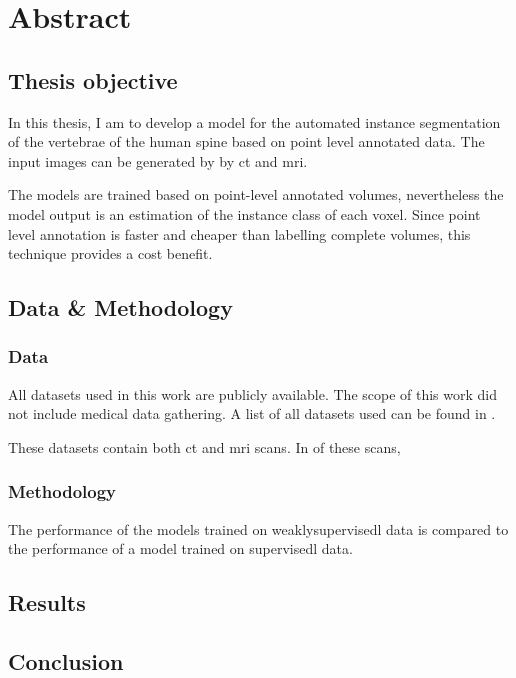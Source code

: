 \chapter{Abstract}

\section{Thesis objective}
In this thesis, I am to develop a model for the automated instance segmentation of the vertebrae of the human spine based on point level annotated data.
The input images can be generated by by \acrfull{ct} and \acrfull{mri}.


The models are trained based on point-level annotated volumes, nevertheless the model output is an estimation of the instance class of each voxel.
Since point level annotation is faster and cheaper than labelling complete volumes, this technique provides a cost benefit. 

\section{Data \& Methodology}

\subsection{Data}
All datasets used in this work are publicly available. 
The scope of this work did not include medical data gathering.
A list of all datasets used can be found in .


These datasets contain both \acrshort{ct} and \acrshort{mri} scans. 
In  of these scans, 

\subsection{Methodology}
The performance of the models trained on \Gls{weaklysupervisedl} data is compared to the performance of a model trained on \Gls{supervisedl} data.


\section{Results}

\section{Conclusion}
